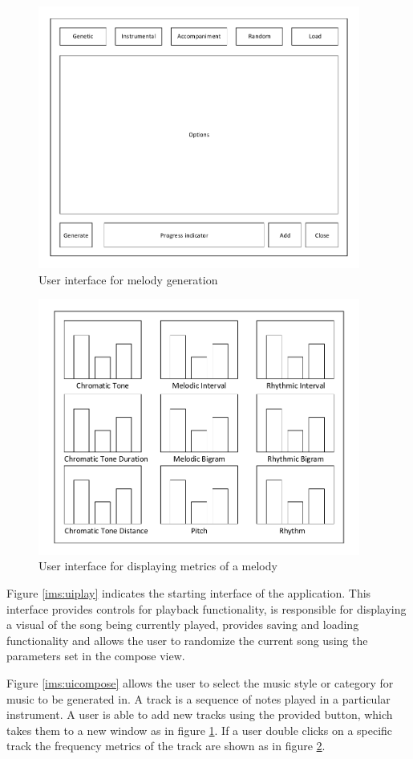 \begin{figure}
\centerline{\includegraphics[width=400px]{../images/ui_track.pdf}}
\caption{User interface for melody generation}
\label{ims:uitrack}
\end{figure}

\begin{figure}
\centerline{\includegraphics[width=400px]{../images/ui_metrics.pdf}}
\caption{User interface for displaying metrics of a melody}
\label{ims:uimetrics}
\end{figure}

Figure \ref{ims:uiplay} indicates the starting interface of the application. This interface provides controls for playback functionality, is responsible for displaying a visual of the song being currently played, provides saving and loading functionality and allows the user to randomize the current song using the parameters set in the compose view.

Figure \ref{ims:uicompose} allows the user to select the music style or category for music to be generated in. A track is a sequence of notes played in a particular instrument. A user is able to add new tracks using the provided button, which takes them to a new window as in figure \ref{ims:uitrack}. If a user double clicks on a specific track the frequency metrics of the track are shown as in figure \ref{ims:uimetrics}.

